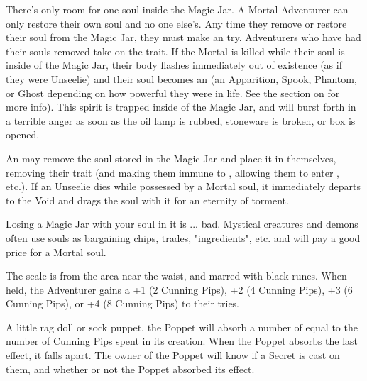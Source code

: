 There's only room for one soul inside the Magic Jar. A Mortal Adventurer can only restore their own soul and no one else's.  Any time they remove or restore their soul from the Magic Jar, they must make an \INSANITY try. Adventurers who have had their souls removed take on the  trait. If the Mortal is killed while their soul is inside of the Magic Jar, their body flashes immediately out of existence (as if they were Unseelie) and their soul becomes an  (an Apparition, Spook, Phantom, or Ghost depending on how powerful they were in life. See the section on  for more info). This spirit is trapped inside of the Magic Jar, and will burst forth in a terrible anger as soon as the oil lamp is rubbed, stoneware is broken, or box is opened.

An  may remove the soul stored in the Magic Jar and place it in themselves, removing their  trait (and making them immune to , allowing them to enter , etc.). If an Unseelie dies while possessed by a Mortal soul, it immediately departs to the Void and drags the soul with it for an eternity of torment.

Losing a Magic Jar with your soul in it is ... bad. Mystical creatures and demons often use souls as bargaining chips, trades, "ingredients", etc. and will pay a good price for a Mortal soul. 



\MARVELS[
  Name=Mermaid's Scale,
  Link=marvels-mermaids-scale,
  Pips=2+
]

The scale is from the area near the waist, and marred with black runes. When held, the Adventurer gains a +1 (2 Cunning Pips), +2 (4 Cunning Pips), +3 (6 Cunning Pips), or +4 (8 Cunning Pips) to their  tries.

\newpage

\MARVELS[
  Name=Poppet,
  Link=marvels-poppet,
  Pips=1+
]

A little rag doll or sock puppet, the Poppet will absorb a number of  equal to the number of Cunning Pips spent in its creation. When the Poppet absorbs the last effect, it falls apart. The owner of the Poppet will know if a Secret is cast on them, and whether or not the Poppet absorbed its effect.

